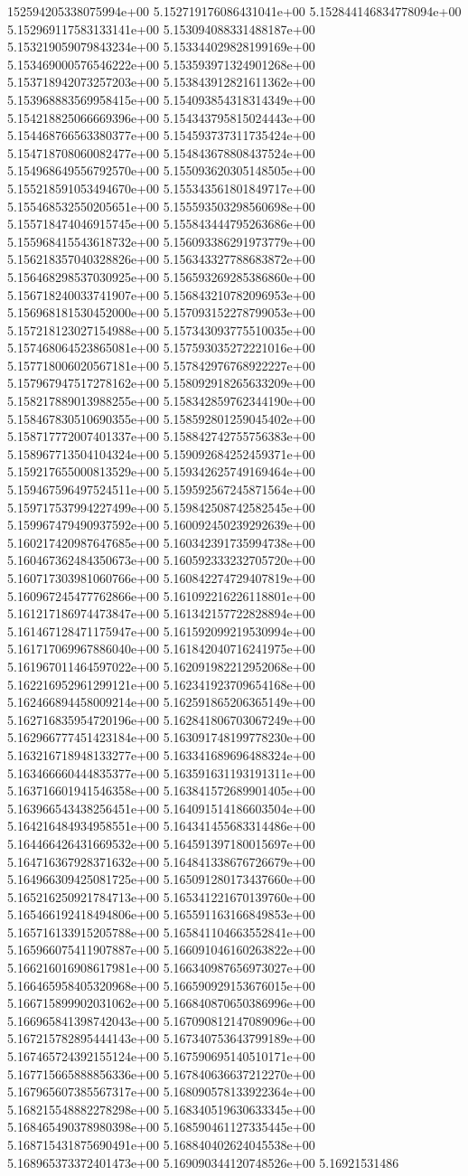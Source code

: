 152594205338075994e+00	5.152719176086431041e+00	5.152844146834778094e+00	5.152969117583133141e+00	5.153094088331488187e+00	5.153219059079843234e+00	5.153344029828199169e+00	5.153469000576546222e+00	5.153593971324901268e+00	5.153718942073257203e+00	5.153843912821611362e+00	5.153968883569958415e+00	5.154093854318314349e+00	5.154218825066669396e+00	5.154343795815024443e+00	5.154468766563380377e+00	5.154593737311735424e+00	5.154718708060082477e+00	5.154843678808437524e+00	5.154968649556792570e+00	5.155093620305148505e+00	5.155218591053494670e+00	5.155343561801849717e+00	5.155468532550205651e+00	5.155593503298560698e+00	5.155718474046915745e+00	5.155843444795263686e+00	5.155968415543618732e+00	5.156093386291973779e+00	5.156218357040328826e+00	5.156343327788683872e+00	5.156468298537030925e+00	5.156593269285386860e+00	5.156718240033741907e+00	5.156843210782096953e+00	5.156968181530452000e+00	5.157093152278799053e+00	5.157218123027154988e+00	5.157343093775510035e+00	5.157468064523865081e+00	5.157593035272221016e+00	5.157718006020567181e+00	5.157842976768922227e+00	5.157967947517278162e+00	5.158092918265633209e+00	5.158217889013988255e+00	5.158342859762344190e+00	5.158467830510690355e+00	5.158592801259045402e+00	5.158717772007401337e+00	5.158842742755756383e+00	5.158967713504104324e+00	5.159092684252459371e+00	5.159217655000813529e+00	5.159342625749169464e+00	5.159467596497524511e+00	5.159592567245871564e+00	5.159717537994227499e+00	5.159842508742582545e+00	5.159967479490937592e+00	5.160092450239292639e+00	5.160217420987647685e+00	5.160342391735994738e+00	5.160467362484350673e+00	5.160592333232705720e+00	5.160717303981060766e+00	5.160842274729407819e+00	5.160967245477762866e+00	5.161092216226118801e+00	5.161217186974473847e+00	5.161342157722828894e+00	5.161467128471175947e+00	5.161592099219530994e+00	5.161717069967886040e+00	5.161842040716241975e+00	5.161967011464597022e+00	5.162091982212952068e+00	5.162216952961299121e+00	5.162341923709654168e+00	5.162466894458009214e+00	5.162591865206365149e+00	5.162716835954720196e+00	5.162841806703067249e+00	5.162966777451423184e+00	5.163091748199778230e+00	5.163216718948133277e+00	5.163341689696488324e+00	5.163466660444835377e+00	5.163591631193191311e+00	5.163716601941546358e+00	5.163841572689901405e+00	5.163966543438256451e+00	5.164091514186603504e+00	5.164216484934958551e+00	5.164341455683314486e+00	5.164466426431669532e+00	5.164591397180015697e+00	5.164716367928371632e+00	5.164841338676726679e+00	5.164966309425081725e+00	5.165091280173437660e+00	5.165216250921784713e+00	5.165341221670139760e+00	5.165466192418494806e+00	5.165591163166849853e+00	5.165716133915205788e+00	5.165841104663552841e+00	5.165966075411907887e+00	5.166091046160263822e+00	5.166216016908617981e+00	5.166340987656973027e+00	5.166465958405320968e+00	5.166590929153676015e+00	5.166715899902031062e+00	5.166840870650386996e+00	5.166965841398742043e+00	5.167090812147089096e+00	5.167215782895444143e+00	5.167340753643799189e+00	5.167465724392155124e+00	5.167590695140510171e+00	5.167715665888856336e+00	5.167840636637212270e+00	5.167965607385567317e+00	5.168090578133922364e+00	5.168215548882278298e+00	5.168340519630633345e+00	5.168465490378980398e+00	5.168590461127335445e+00	5.168715431875690491e+00	5.168840402624045538e+00	5.168965373372401473e+00	5.169090344120748526e+00	5.16921531486